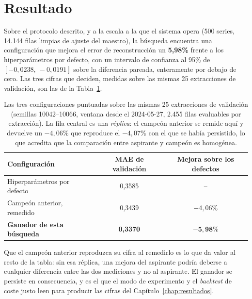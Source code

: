 \section{Resultado}
\label{sec:tuning_resultado}

Sobre el protocolo descrito, y a la escala a la que el sistema opera (500 series, 14.144 filas
limpias de ajuste del maestro), la búsqueda encuentra una configuración que mejora el error de
reconstrucción un \textbf{5{,}98\%} frente a los hiperparámetros por defecto, con un intervalo de
confianza al 95\% de $[-0{,}0238,\ -0{,}0191]$ sobre la diferencia pareada, enteramente por
debajo de cero. Las tres cifras que deciden, medidas sobre las mismas 25 extracciones de
validación, son las de la Tabla~\ref{tab:tuning_resultado}.

\begin{table}[htbp]
    \centering
    \small
    \begin{tabular}{lcc}
        \toprule
        \textbf{Configuración} & \textbf{MAE de validación} & \textbf{Mejora sobre los defectos} \\
        \midrule
        Hiperparámetros por defecto & 0,3585 & -- \\
        Campeón anterior, remedido   & 0,3439 & $-4{,}06\%$ \\
        \textbf{Ganador de esta búsqueda} & \textbf{0,3370} & $\mathbf{-5{,}98\%}$ \\
        \bottomrule
    \end{tabular}
    \caption[Las tres configuraciones sobre la validación común]{Las tres configuraciones puntuadas sobre las mismas 25 extracciones de validación
    (semillas 10042--10066, ventana desde el 2024-05-27, 2.455 filas evaluables por extracción).
    La fila central es una \emph{réplica}: el campeón anterior se remide aquí y devuelve un
    $-4{,}06\%$ que reproduce el $-4{,}07\%$ con el que se había persistido, lo que acredita que
    la comparación entre aspirante y campeón es homogénea.}
    \label{tab:tuning_resultado}
\end{table}

Que el campeón anterior reproduzca su cifra al remedirlo es lo que da valor al resto de la tabla:
sin esa réplica, una mejora del aspirante podría deberse a cualquier diferencia entre las dos
mediciones y no al aspirante. El ganador se persiste en consecuencia, y es el que el modo de
experimento y el \textit{backtest} de coste justo leen para producir las cifras del
Capítulo~\ref{chap:resultados}.

